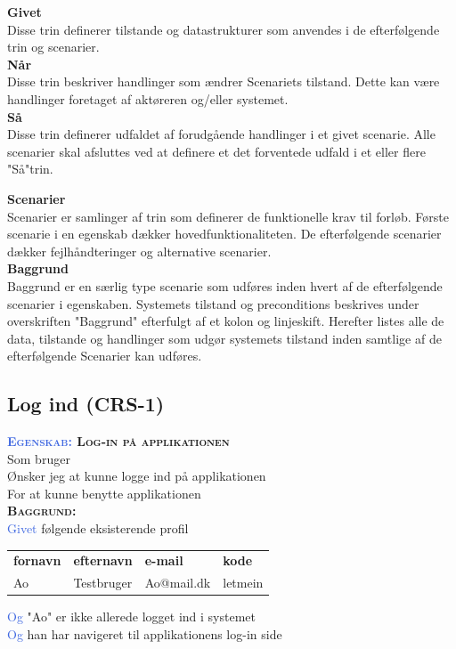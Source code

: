 \large{\textbf{Givet}}\\
Disse trin definerer tilstande og datastrukturer som anvendes i de 
efterfølgende trin og scenarier.\\
\large{\textbf{Når}}\\
Disse trin beskriver handlinger som ændrer Scenariets tilstand. Dette kan 
være handlinger	foretaget af aktøreren og/eller systemet.\\
\large{\textbf{Så}}\\
Disse trin definerer udfaldet af forudgående handlinger i et givet 
scenarie. Alle scenarier skal afsluttes ved at definere et det forventede 
udfald i et eller flere "Så"trin.

\large{\textbf{Scenarier}}\\
Scenarier er samlinger af trin som definerer de funktionelle krav til 
forløb. Første scenarie i en egenskab dækker hovedfunktionaliteten. De 
efterfølgende scenarier dækker fejlhåndteringer og alternative scenarier.\\
\large{\textbf{Baggrund}}\\
Baggrund er en særlig type scenarie som udføres inden hvert af de 
efterfølgende scenarier	i egenskaben. Systemets tilstand og preconditions 
beskrives under overskriften "Baggrund" efterfulgt af et kolon og 
linjeskift. Herefter listes alle de data, tilstande og handlinger som udgør 
systemets tilstand inden samtlige af de efterfølgende Scenarier kan	udføres.


\subsection{Log ind (CRS-1)} \label{sec:USLogInd}
\textbf{\textsc{\textcolor{RoyalBlue} {Egenskab:} Log-in på applikationen}} \\
Som bruger\\
Ønsker jeg at kunne logge ind på applikationen\\
For at kunne benytte applikationen\\

\textbf{\textsc{\color{RoyalBlue}Baggrund:}}\\
\textcolor{RoyalBlue}{Givet} følgende eksisterende profil\\
\begin{tabular}{| l | l | l | l |}
	\textbf{fornavn} & \textbf{efternavn} & \textbf{e-mail} & \textbf{kode} \\
	Ao & Testbruger & Ao@mail.dk & letmein\\
\end{tabular}
\newline \newline
\textcolor{RoyalBlue}{Og} "Ao" er ikke allerede logget ind i systemet\\
\textcolor{RoyalBlue}{Og} han har navigeret til applikationens log-in side\\

